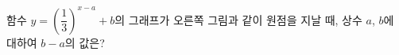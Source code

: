 \noindent\begin{minipage}[t]{0.58\linewidth}\vspace{0pt}\raggedright 함수 $y=\left(\dfrac{1}{3}\right)^{x-a}+b$의 그래프가 오른쪽 그림과 같이 원점을 지날 때, 상수 $a$, $b$에 대하여 $b-a$의 값은? \end{minipage}\hfill\begin{minipage}[t]{0.4\linewidth}\vspace{0pt}\centering \resizebox{\ifdim\width>\linewidth\linewidth\else\width\fi}{!}{}\end{minipage}\par
{}
